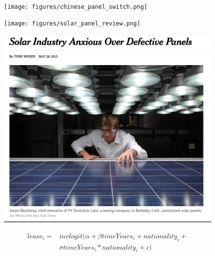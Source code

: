 \documentclass{beamer}
\begin{document}
\begin{frame}[plain]
	\begin{figure}
	\texttt{[image: figures/chinese\_panel\_switch.png]}
	\end{figure}	
\end{frame}

\begin{frame}[plain]
	\begin{figure}
		\texttt{[image: figures/solar\_panel\_review.png]}
	\end{figure}	
\end{frame}

\begin{frame}[plain]
	\begin{figure}
		\includegraphics[width=.8\textwidth]{figures/solar_quality_nyt.png}
	\end{figure}
\end{frame}

\begin{frame}[plain]
	\begin{equation}
	\begin{split}
		lease_i = & invlogit(\alpha + \beta timeYears_i + nationality_i +\\ 
		& \sigma timeYears_i*nationality_i + \epsilon)
	\end{split}
	\end{equation}	
\end{frame}
\end{document}
